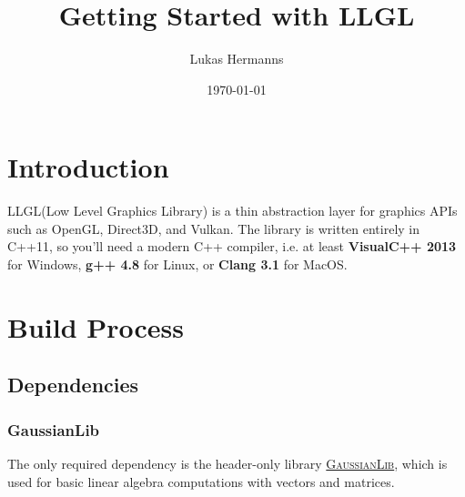 \documentclass{article}
\title{Getting Started with LLGL}
\author{Lukas Hermanns}
\date{\today}
\begin{document}

\def\LLGL{\textcolor{darkBlueColor}{LLGL}\xspace}


\maketitle



\section*{Introduction}

\LLGL (Low Level Graphics Library) is a thin abstraction layer for graphics APIs such as
OpenGL, Direct3D, and Vulkan. The library is written entirely in C++11, so you'll
need a modern C++ compiler, i.e. at least \textbf{VisualC++ 2013} for Windows,
\textbf{g++ 4.8} for Linux, or \textbf{Clang 3.1} for MacOS.



\section*{Build Process}

\subsection*{Dependencies}

\subsubsection*{GaussianLib}

The only required dependency is the header-only library
\href{https://github.com/LukasBanana/GaussianLib}{\textsc{GaussianLib}},
which is used for basic linear algebra computations with vectors and matrices.
\end{document}
